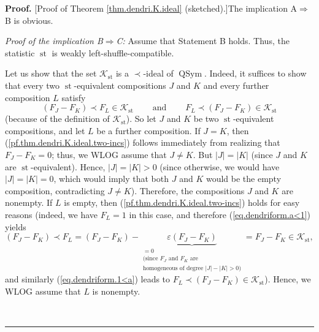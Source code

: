 \documentclass[numbers=enddot,12pt,final,onecolumn,notitlepage]{scrartcl}%
\theoremstyle{definition}
\newenvironment{proof}[1][Proof]{\noindent\textbf{#1.} }{\ \rule{0.5em}{0.5em}}
\begin{document}
\begin{proof}
[Proof of Theorem \ref{thm.dendri.K.ideal} (sketched).]The implication
A$\Longrightarrow$B is obvious.

\textit{Proof of the implication B}$\Longrightarrow$\textit{C:} Assume that
Statement B holds. Thus, the statistic $\operatorname*{st}$ is weakly left-shuffle-compatible.

Let us show that the set $\mathcal{K}_{\operatorname*{st}}$ is a $\left.
\prec\right.  $-ideal of $\operatorname*{QSym}$. Indeed, it suffices to show
that every two $\operatorname*{st}$-equivalent compositions $J$ and $K$ and
every further composition $L$ satisfy%
\begin{equation}
\left(  F_{J}-F_{K}\right)  \left.  \prec\right.  F_{L}\in\mathcal{K}%
_{\operatorname*{st}}\ \ \ \ \ \ \ \ \ \ \text{and}\ \ \ \ \ \ \ \ \ \ F_{L}%
\left.  \prec\right.  \left(  F_{J}-F_{K}\right)  \in\mathcal{K}%
_{\operatorname*{st}} \label{pf.thm.dendri.K.ideal.two-incs}%
\end{equation}
(because of the definition of $\mathcal{K}_{\operatorname*{st}}$). So let $J$
and $K$ be two $\operatorname*{st}$-equivalent compositions, and let $L$ be a
further composition. If $J=K$, then (\ref{pf.thm.dendri.K.ideal.two-incs})
follows immediately from realizing that $F_{J}-F_{K}=0$; thus, we WLOG assume
that $J\neq K$. But $\left\vert J\right\vert =\left\vert K\right\vert $ (since
$J$ and $K$ are $\operatorname*{st}$-equivalent). Hence, $\left\vert
J\right\vert =\left\vert K\right\vert >0$ (since otherwise, we would have
$\left\vert J\right\vert =\left\vert K\right\vert =0$, which would imply that
both $J$ and $K$ would be the empty composition, contradicting $J\neq K$).
Therefore, the compositions $J$ and $K$ are nonempty. If $L$ is empty, then
(\ref{pf.thm.dendri.K.ideal.two-incs}) holds for easy reasons (indeed, we have
$F_{L}=1$ in this case, and therefore (\ref{eq.dendriform.a<1}) yields
\[
\left(  F_{J}-F_{K}\right)  \left.  \prec\right.  F_{L}=\left(  F_{J}%
-F_{K}\right)  -\underbrace{\varepsilon\left(  F_{J}-F_{K}\right)
}_{\substack{=0\\\text{(since }F_{J}\text{ and }F_{K}\text{ are}%
\\\text{homogeneous of degree }\left\vert J\right\vert -\left\vert
K\right\vert >0\text{)}}}=F_{J}-F_{K}\in\mathcal{K}_{\operatorname*{st}},
\]
and similarly (\ref{eq.dendriform.1<a}) leads to $F_{L}\left.  \prec\right.
\left(  F_{J}-F_{K}\right)  \in\mathcal{K}_{\operatorname*{st}}$). Hence, we
WLOG assume that $L$ is nonempty.


\end{proof}
\end{document}
